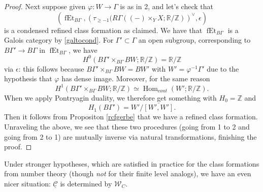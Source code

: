 \documentclass[12pt]{article}
\theoremstyle{definition}
\newcommand{\on}{\operatorname}
\newcommand{\mc}{\mathcal}
\newcommand{\mbb}{\mathbb}
\newcommand{\ul}{\underline}
\begin{document}
\begin{proof}
Next suppose given $\varphi:W\to \Gamma$ is as in 2, and let's check that
$$(\on{fEt}_{B\Gamma},\left(\tau_{\geq -1}(R\Gamma((-)\times_YX;\mbb{R}/\mbb{Z})\right)^\vee,\epsilon)$$
is a condensed refined class formation as claimed.  We have that $\on{fEt}_{B\Gamma}$ is a Galois category by \ref{galtocond}.  For $\Gamma'\subset \Gamma$ an open subgroup, corresponding to $B\Gamma' \to B\Gamma$ in $\on{fEt}_{B\Gamma}$, we have
$$H^0(B\Gamma'\times_{B\Gamma}BW;\mbb{R}/\mbb{Z})=\mbb{R}/\mbb{Z}$$
via $\epsilon$: this follows because $B\Gamma'\times_{B\Gamma}BW = BW'$ with $W'=\varphi^{-1}\Gamma'$ due to the hypothesis that $\varphi$ has dense image.  Moreover, for the same reason
$$H^1(B\Gamma'\times_{B\Gamma}BW;\mbb{R}/\mbb{Z})\simeq \on{Hom}_{cont}(W';\mbb{R}/\mbb{Z}).$$
When we apply Pontryagin duality, we therefore get something with $H_0 = \mbb{Z}$ and $$H_{1}(B\Gamma') = W'/\overline{[W',W']}.$$
Then it follows from Propositon \ref{rcfgerbe} that we have a refined class formation.  Unraveling the above, we see that these two procedures (going from 1 to 2 and going from 2 to 1) are mutually inverse via natural transformations, finishing the proof.
\end{proof}

Under stronger hypotheses, which are satisfied in practice for the class formations from number theory (though \emph{not} for their finite level analogs), we have an even nicer situation: $\ul{\mc{C}}$ is determined by $\mc{W}_C$.
\end{document}
